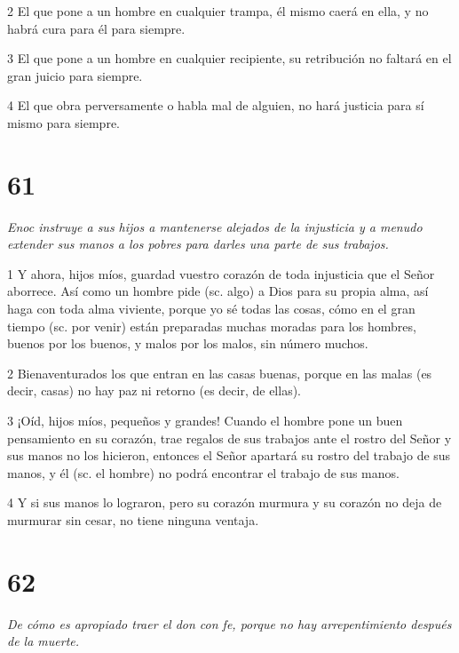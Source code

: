 \par 2 El que pone a un hombre en cualquier trampa, él mismo caerá en ella, y no habrá cura para él para siempre.

\par 3 El que pone a un hombre en cualquier recipiente, su retribución no faltará en el gran juicio para siempre.

\par 4 El que obra perversamente o habla mal de alguien, no hará justicia para sí mismo para siempre.

\chapter{61}

\par \textit{Enoc instruye a sus hijos a mantenerse alejados de la injusticia y a menudo extender sus manos a los pobres para darles una parte de sus trabajos.}

\par 1 Y ahora, hijos míos, guardad vuestro corazón de toda injusticia que el Señor aborrece. Así como un hombre pide (sc. algo) a Dios para su propia alma, así haga con toda alma viviente, porque yo sé todas las cosas, cómo en el gran tiempo (sc. por venir) están preparadas muchas moradas para los hombres, buenos por los buenos, y malos por los malos, sin número muchos.

\par 2 Bienaventurados los que entran en las casas buenas, porque en las malas (es decir, casas) no hay paz ni retorno (es decir, de ellas).

\par 3 ¡Oíd, hijos míos, pequeños y grandes! Cuando el hombre pone un buen pensamiento en su corazón, trae regalos de sus trabajos ante el rostro del Señor y sus manos no los hicieron, entonces el Señor apartará su rostro del trabajo de sus manos, y él (sc. el hombre) no podrá encontrar el trabajo de sus manos.

\par 4 Y si sus manos lo lograron, pero su corazón murmura y su corazón no deja de murmurar sin cesar, no tiene ninguna ventaja.

\chapter{62}

\par \textit{De cómo es apropiado traer el don con fe, porque no hay arrepentimiento después de la muerte.}

